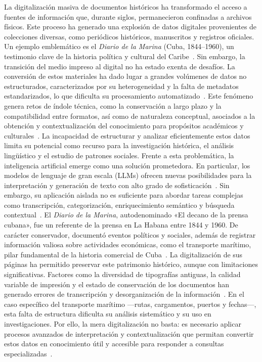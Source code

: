 \introduction

\setlength{\parindent}{0pt} %
\setlength{\parskip}{10pt}  %

La digitalización masiva de documentos históricos ha transformado el acceso a fuentes de información que, durante siglos, permanecieron confinadas a archivos físicos. Este proceso ha generado una explosión de datos digitales provenientes de colecciones diversas, como periódicos históricos, manuscritos y registros oficiales. Un ejemplo emblemático es el \textit{Diario de la Marina} (Cuba, 1844–1960), un testimonio clave de la historia política y cultural del Caribe~\cite{wikipedia_diario}. Sin embargo, la transición del medio impreso al digital no ha estado exenta de desafíos. La conversión de estos materiales ha dado lugar a grandes volúmenes de datos no estructurados, caracterizados por su heterogeneidad y la falta de metadatos estandarizados, lo que dificulta su procesamiento automatizado~\cite{lucidea_metadata}. Este fenómeno genera retos de índole técnica, como la conservación a largo plazo y la compatibilidad entre formatos, así como de naturaleza conceptual, asociados a la obtención y contextualización del conocimiento para propósitos académicos y culturales~\cite{lucidea_metadata}. La incapacidad de estructurar y analizar eficientemente estos datos limita su potencial como recurso para la investigación histórica, el análisis lingüístico y el estudio de patrones sociales. Frente a esta problemática, la inteligencia artificial emerge como una solución prometedora. En particular, los modelos de lenguaje de gran escala (LLMs) ofrecen nuevas posibilidades para la interpretación y generación de texto con alto grado de sofisticación~\cite{proposed_llm}. Sin embargo, su aplicación aislada no es suficiente para abordar tareas complejas como transcripción, categorización, enriquecimiento semántico y búsqueda contextual~\cite{proposed_llm}. El \textit{Diario de la Marina}, autodenominado «El decano de la prensa cubana», fue un referente de la prensa en La Habana entre 1844 y 1960. De carácter conservador, documentó eventos políticos y sociales, además de registrar información valiosa sobre actividades económicas, como el transporte marítimo, pilar fundamental de la historia comercial de Cuba~\cite{wikipedia_diario}. La digitalización de sus páginas ha permitido preservar este patrimonio histórico, aunque con limitaciones significativas. Factores como la diversidad de tipografías antiguas, la calidad variable de impresión y el estado de conservación de los documentos han generado errores de transcripción y desorganización de la información~\cite{enhancing_degraded}. En el caso específico del transporte marítimo —rutas, cargamentos, puertos y fechas—, esta falta de estructura dificulta su análisis sistemático y su uso en investigaciones. Por ello, la mera digitalización no basta: es necesario aplicar procesos avanzados de interpretación y contextualización que permitan convertir estos datos en conocimiento útil y accesible para responder a consultas especializadas~\cite{ai_assisted, enhancing_degraded}.


